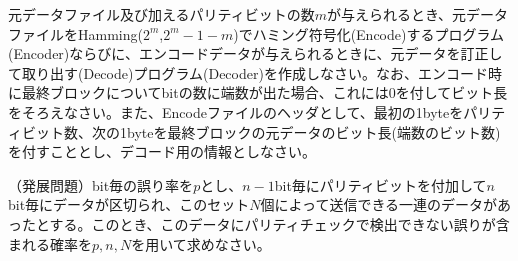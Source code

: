 \begin{problems}
\item 元データファイル及び加えるパリティビットの数$m$が与えられるとき、元データファイルをHamming($2^m$,$2^m-1-m$)でハミング符号化(Encode)するプログラム(Encoder)ならびに、エンコードデータが与えられるときに、元データを訂正して取り出す(Decode)プログラム(Decoder)を作成しなさい。なお、エンコード時に最終ブロックについてbitの数に端数が出た場合、これには0を付してビット長をそろえなさい。また、Encodeファイルのヘッダとして、最初の1byteをパリティビット数、次の1byteを最終ブロックの元データのビット長(端数のビット数)を付すこととし、デコード用の情報としなさい。

\item （発展問題）bit毎の誤り率を$p$とし、$n-1$bit毎にパリティビットを付加して$n$bit毎にデータが区切られ、このセット$N$個によって送信できる一連のデータがあったとする。このとき、このデータにパリティチェックで検出できない誤りが含まれる確率を$p,n,N$を用いて求めなさい。
\end{problems}

